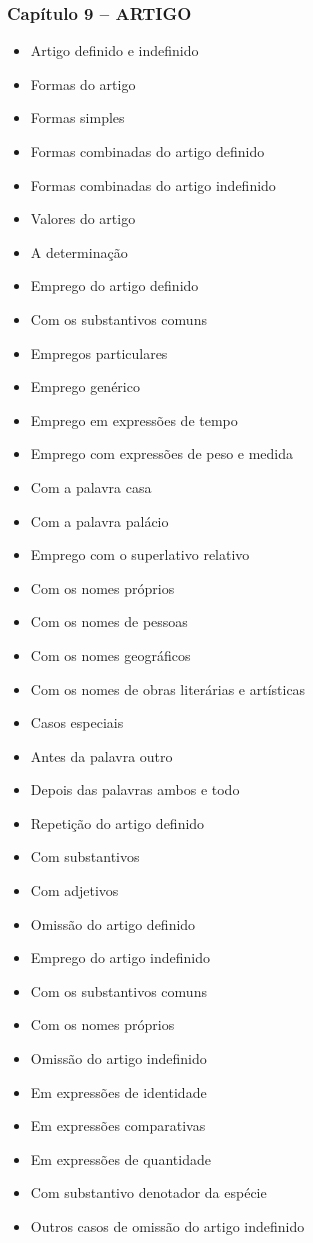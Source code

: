 \documentclass[a4paper,12pt]{article}[abntex2]
\begin{document}
\subsubsection*{Capítulo 9 – ARTIGO}
\begin{itemize}
    \item Artigo definido e indefinido
    \item Formas do artigo
    \item Formas simples
    \item Formas combinadas do artigo definido
    \item Formas combinadas do artigo indefinido
    \item Valores do artigo
    \item A determinação
    \item Emprego do artigo definido
    \item Com os substantivos comuns
    \item Empregos particulares
    \item Emprego genérico
    \item Emprego em expressões de tempo
    \item Emprego com expressões de peso e medida
    \item Com a palavra casa
    \item Com a palavra palácio
    \item Emprego com o superlativo relativo
    \item Com os nomes próprios
    \item Com os nomes de pessoas
    \item Com os nomes geográficos
    \item Com os nomes de obras literárias e artísticas
    \item Casos especiais
    \item Antes da palavra outro
    \item Depois das palavras ambos e todo
    \item Repetição do artigo definido
    \item Com substantivos
    \item Com adjetivos
    \item Omissão do artigo definido
    \item Emprego do artigo indefinido
    \item Com os substantivos comuns
    \item Com os nomes próprios
    \item Omissão do artigo indefinido
    \item Em expressões de identidade
    \item Em expressões comparativas
    \item Em expressões de quantidade
    \item Com substantivo denotador da espécie
    \item Outros casos de omissão do artigo indefinido
\end{itemize}
\end{document}

